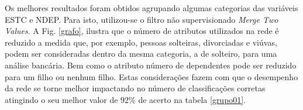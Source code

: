 \documentclass[journal, a4paper]{IEEEtran}
\begin{document}
	Os melhores resultados foram obtidos agrupando algumas categorias das variáveis ESTC e NDEP. Para isto, utilizou-se o filtro não supervisionado \textit{Merge Two Values}. A Fig. \ref{grafo}, ilustra que o número de atributos utilizados na rede é reduzido a medida que, por exemplo, pessoas solteiras, divorciadas e viúvas, podem ser consideradas dentro da mesma categoria, a de solteiro, para uma análise bancária. Bem como o atributo número de dependentes pode ser reduzido para um filho ou nenhum filho. Estas considerações fazem com que o desempenho da rede se torne melhor impactando no número de classificações corretas atingindo o seu melhor valor de $92\%$ de acerto na tabela \ref{grupo01}.
	







\end{document}

